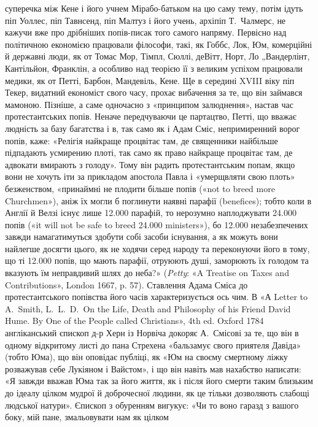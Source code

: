 {суперечка між Кене і його учнем Мірабо-батьком на цю саму тему,
потім ідуть піп Уоллес, піп Тавнсенд, піп Малтуз і його учень, архіпіп
Т.~Чалмерс, не кажучи вже про дрібніших попів-писак того самого напряму.
Первісно над політичною економією працювали філософи, такі,
як Гоббс, Лок, Юм, комерційні й державні люди, як от Томас Мор, Тімпл,
Сюллі, деВітт, Норт, Ло „Вандерлінт, Кантільйон, Франклін, а особливо
над теорією її з великим успіхом працювали медики, як от Петті, Барбон,
Мандевіль, Кене. Ще в середині XVIII віку піп Текер, видатний економіст
свого часу, прохає вибачення за те, що він займався мамоною. Пізніше,
а саме одночасно з «принципом залюднення», настав час протестантських
попів. Неначе передчуваючи це партацтво, Петті, що вважає людність
за базу багатства і в, так само як і Адам Сміс, непримиренний
ворог попів, каже: «Релігія найкраще процвітає там, де священники найбільше
підпадають усмирению плоті, так само як право найкраще процвітає
там, де адвокати вмирають з голоду». Тому він радить протестантським
попам, якщо вони не хочуть іти за прикладом апостола Павла
і «умерщвляти свою плоть» безженством, «принаймні не плодити більше
попів («not to breed more Churchmen»), аніж їх могли б поглинути наявні
парафії (benefices); тобто коли в Англії й Велзі існує лише \num{12.000} парафій,
то нерозумно наплоджувати \num{24.000} попів («it will not be safe to breed
\num{24.000} ministers»), бо \num{12.000} незабезпечених завжди намагатимуться
здобути собі засоби існування, а як можуть вони найлегше досягти цього,
як не ходячи серед народу та переконуючи його в тому, що ті \num{12.000} попів,
що мають парафії, отруюють душі, заморюють їх голодом та вказують
їм неправдивий шлях до неба?» (\emph{Petty}: «A Treatise on Taxes and
Contributions», London 1667, p. 57). Ставлення Адама Сміса до протестантського
попівства його часів характеризується ось чим. В «А Letter to A.~Smith,
L.~L.~D.~On the Life, Death and Philosophy of his Friend David Hume.
By One of the People called Christians», 4th ed. Oxford 1784 англіканський
єпископ д-р Херн із Норвіча докоряє А.~Смісові за те, що він в одному
відкритому листі до пана Стрехена «бальзамує свого приятеля Давіда»
(тобто Юма), що він оповідає публіці, як «Юм на своєму смертному ліжку
розважував себе Лукіяном і Вайстом», і що він навіть мав нахабство написати:
«Я завжди вважав Юма так за його життя, як і після його смерти
таким близьким до ідеалу цілком мудрої й доброчесної людини, як це тільки
дозволяють слабощі людської натури». Єпископ з обуренням вигукує:
«Чи то воно гаразд з вашого боку, мій пане, змальовувати нам як цілком
}
